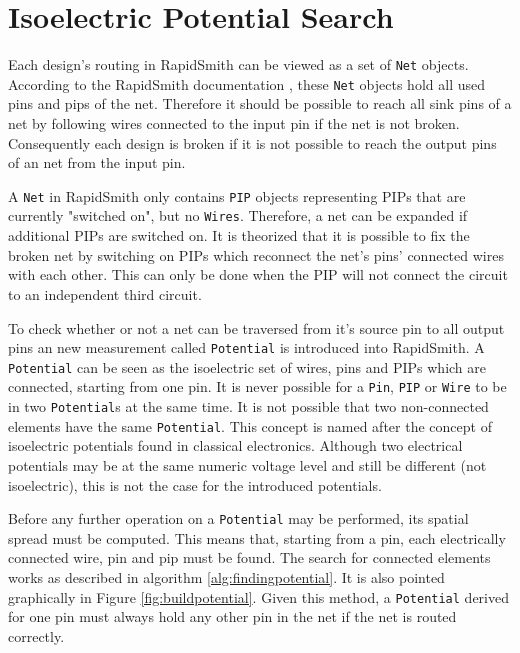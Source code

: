 \section{Isoelectric Potential Search}
\label{sec:isolectricelements}

Each design's routing in RapidSmith can be viewed as a set of \texttt{Net} objects. According to the RapidSmith documentation \cite{rapidsmith}, these \texttt{Net} objects hold all used pins and pips of the net.
Therefore it should be possible to reach all sink pins of a net by following wires connected to the input pin if the net is not broken.
Consequently each design is broken if it is not possible to reach the output pins of an net from the input pin.  

A \texttt{Net} in RapidSmith only contains \texttt{PIP} objects representing PIPs that are currently "switched on", but no \texttt{Wires}. Therefore, a net can be expanded if additional PIPs are switched on. 
It is theorized that it is possible to fix the broken net by switching on PIPs which reconnect the net's pins' connected wires with each other. This can only be done when the PIP will not connect the circuit to an independent third circuit.

To check whether or not a net can be traversed from it's source pin to all output pins an new measurement called \texttt{Potential} is introduced into RapidSmith.
A \texttt{Potential} can be seen as the isoelectric set of wires, pins and PIPs which are connected, starting from one pin.
It is never possible for a \texttt{Pin}, \texttt{PIP} or \texttt{Wire} to be in two \texttt{Potential}s at the same time. It is not possible that two non-connected elements have the same \texttt{Potential}. 
This concept is named after the concept of isoelectric potentials found in classical electronics. Although two electrical potentials may be at the same numeric voltage level and still be different (not isoelectric), this is not the case for the introduced potentials.

Before any further operation on a \texttt{Potential} may be performed, its spatial spread must be computed. This means that, starting from a pin, each electrically connected wire, pin and pip must be found. The search for connected elements works as described in algorithm \ref{alg:findingpotential}. It is also pointed graphically in Figure \ref{fig:buildpotential}. Given this method, a \texttt{Potential} derived for one pin must always hold any other pin in the net if the net is routed correctly.

